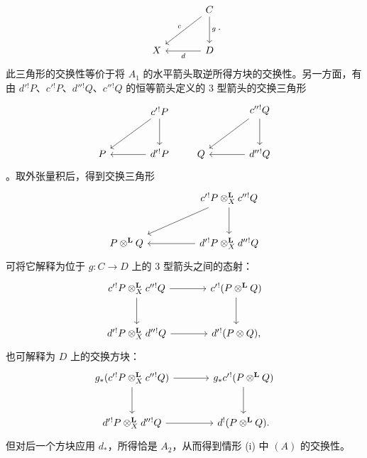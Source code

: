 \begin{prooftext}[证明]
\[\begin{tikzcd}[column sep=large,row sep=large]
& C\arrow[d,"g"]\arrow[dl,"c"']\\
X & D\arrow[l,"d"]
\end{tikzcd}.
\]
此三角形的交换性等价于将 $A_1$ 的水平箭头取逆所得方块的交换性。另一方面，有由 $d'{}^!P$、$c'{}^!P$、$d''{}^!Q$、$c''{}^!Q$ 的恒等箭头定义的 $3$ 型箭头的交换三角形
\[
\begin{tikzcd}[column sep=large,row sep=large]
& c'{}^!P \arrow[d]\arrow[dl]\\
P & d'{}^!P\arrow[l]
\end{tikzcd}
\qquad
\begin{tikzcd}[column sep=large,row sep=large]
& c''{}^!Q \arrow[d]\arrow[dl]\\
Q & d''{}^!Q\arrow[l]
\end{tikzcd}
\]
。取外张量积后，得到交换三角形
\[
\begin{tikzcd}[column sep=huge,row sep=large]
& c'{}^!P\otimes_X^{\mathbf L}c''{}^!Q \arrow[d]\arrow[dl]\\
P\otimes^{\mathbf L}Q & d'{}^!P\otimes_X^{\mathbf L}d''{}^!Q\arrow[l]
\end{tikzcd}
\]
可将它解释为位于 $g:C\longrightarrow D$ 上的 $3$ 型箭头之间的态射：
\[
\begin{tikzcd}[column sep=large,row sep=large]
c'{}^!P\otimes_X^{\mathbf L}c''{}^!Q \arrow[r]\arrow[d] &
c'{}^!(P\otimes^{\mathbf L}Q)\arrow[d]\\
d'{}^!P\otimes_X^{\mathbf L}d''{}^!Q \arrow[r] &
d'{}^!(P\otimes Q),
\end{tikzcd}
\]
也可解释为 $D$ 上的交换方块：
\[
\begin{tikzcd}[column sep=large,row sep=large]
g_*(c'{}^!P\otimes_X^{\mathbf L}c''{}^!Q) \arrow[r]\arrow[d] &
g_*c'{}^!(P\otimes^{\mathbf L}Q)\arrow[d]\\
d'{}^!P\otimes_X^{\mathbf L}d''{}^!Q \arrow[r] &
d^!(P\otimes^{\mathbf L}Q).
\end{tikzcd}
\]
但对后一个方块应用 $d_*$，所得恰是 $A_2$，从而得到情形 (i) 中 $(A)$ 的交换性。


\end{prooftext}
